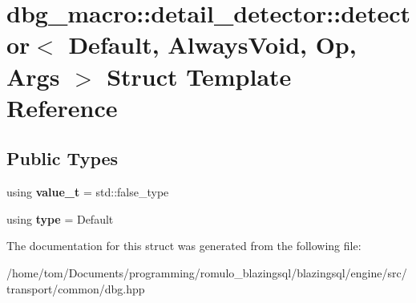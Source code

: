 \hypertarget{structdbg__macro_1_1detail__detector_1_1detector}{}\section{dbg\+\_\+macro\+:\+:detail\+\_\+detector\+:\+:detector$<$ Default, Always\+Void, Op, Args $>$ Struct Template Reference}
\label{structdbg__macro_1_1detail__detector_1_1detector}
\subsection*{Public Types}
\begin{DoxyCompactItemize}
\item 
\mbox{\label{structdbg__macro_1_1detail__detector_1_1detector_a11b9c34330b57adc46f0c3c2aa1a6044}} 
using {\bfseries value\+\_\+t} = std\+::false\+\_\+type
\item 
\mbox{\label{structdbg__macro_1_1detail__detector_1_1detector_a05dbc27e20554b58705f92751713a101}} 
using {\bfseries type} = Default
\end{DoxyCompactItemize}


The documentation for this struct was generated from the following file\+:\begin{DoxyCompactItemize}
\item 
/home/tom/\+Documents/programming/romulo\+\_\+blazingsql/blazingsql/engine/src/transport/common/dbg.\+hpp\end{DoxyCompactItemize}

